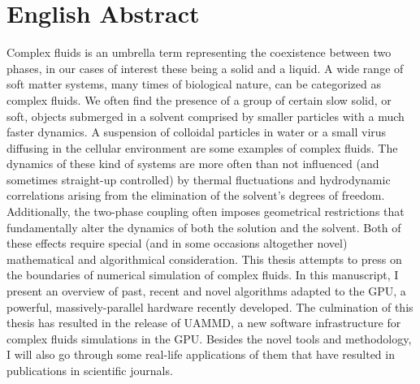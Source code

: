 \documentclass[ twoside,openright,titlepage,numbers=noenddot,%
headinclude,footinclude,cleardoublepage=empty,abstract=on,
BCOR=5mm,paper=a4,fontsize=11pt, dvipsnames
]{scrreprt}
\begin{document}
\frenchspacing
\raggedbottom
{} %
\pagestyle{plain}




\cleardoublepage
\cleardoublepage
\begingroup
\let\cleardoublepage\relax
\let\cleardoublepage\relax
\let\cleardoublepage\relax

\chapter*{English Abstract}

Complex fluids is an umbrella term representing the coexistence between two phases, in our cases of interest these being a solid and a liquid. A wide range of soft matter systems, many times of biological nature, can be categorized as complex fluids. We often find the presence of a group of certain slow solid, or soft, objects submerged in a solvent comprised by smaller particles with a much faster dynamics. A suspension of colloidal particles in water or a small virus diffusing in the cellular environment are some examples of complex fluids. The dynamics of these kind of systems are more often than not influenced (and sometimes straight-up controlled) by thermal fluctuations and hydrodynamic correlations arising from the elimination of the solvent's degrees of freedom. Additionally, the two-phase coupling often imposes geometrical restrictions that fundamentally alter the dynamics of both the solution and the solvent. Both of these effects require special (and in some occasions altogether novel) mathematical and algorithmical consideration. This thesis attempts to press on the boundaries of numerical simulation of complex fluids. In this manuscript, I present an overview of past, recent and novel algorithms adapted to the GPU, a powerful, massively-parallel hardware recently developed. The culmination of this thesis has resulted in the release of UAMMD, a new software infrastructure for complex fluids simulations in the GPU. Besides the novel tools and methodology, I will also go through some real-life applications of them that have resulted in publications in scientific journals.
\end{document}
